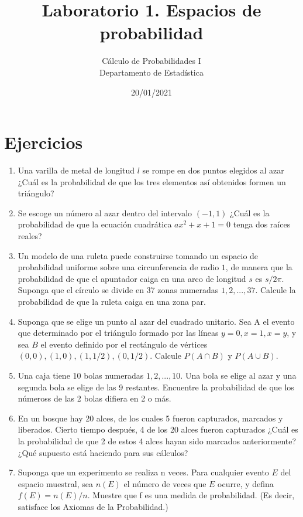 \documentclass[a4paper]{article}
\title{Laboratorio 1. Espacios de probabilidad}
\author{Cálculo de Probabilidades I\\
        Departamento de Estadística\\
}
\date{20/01/2021}
\begin{document}
\maketitle

\section*{Ejercicios}

\begin{enumerate}
\item Una varilla de metal de longitud $l$ se rompe en dos puntos elegidos al azar ¿Cuál es la probabilidad de que los tres elementos así obtenidos formen un triángulo?

\item Se escoge un número al azar dentro del intervalo $(-1,1)$ ¿Cuál es la probabilidad de que la ecuación cuadrática $ax^2 + x + 1 = 0$ tenga dos raíces reales?

\item Un modelo de una ruleta puede construirse tomando un espacio de probabilidad uniforme sobre una circunferencia de radio $1$, de manera que la probabilidad de que el apuntador caiga en una arco de longitud $s$ es $s/2\pi$. Suponga que el círculo se divide en 37 zonas numeradas $1, 2, . . . , 37$. Calcule la probabilidad de que la ruleta caiga en una zona par.

\item Suponga que se elige un punto al azar del cuadrado unitario. Sea A el evento que determinado por el triángulo formado por las líneas $y = 0, x = 1, x = y$, y sea $B$ el evento definido por el rectángulo de vértices $(0, 0), (1, 0), (1, 1/2), (0, 1/2)$. Calcule $P(A \cap B)$ y $P(A \cup B)$.

\item Una caja tiene 10 bolas numeradas $1, 2, . . . , 10$. Una bola se elige al azar y una segunda bola se elige de las 9 restantes. Encuentre la probabilidad de que los númeross de las 2 bolas difiera en 2 o más.

\item En un bosque hay 20 alces, de los cuales 5 fueron capturados, marcados y liberados. Cierto tiempo después, 4 de los 20 alces fueron capturados ¿Cuál es la probabilidad de que 2 de estos 4 alces hayan sido marcados anteriormente? ¿Qué supuesto está haciendo para sus cálculos?

\item Suponga que un experimento se realiza n veces. Para cualquier evento $E$ del espacio muestral, sea $n(E)$ el número de veces que $E$ ocurre, y defina $f(E) = n(E)/n$. Muestre que f es una medida de probabilidad. (Es decir, satisface los Axiomas de la Probabilidad.)


\end{enumerate}
\end{document}
